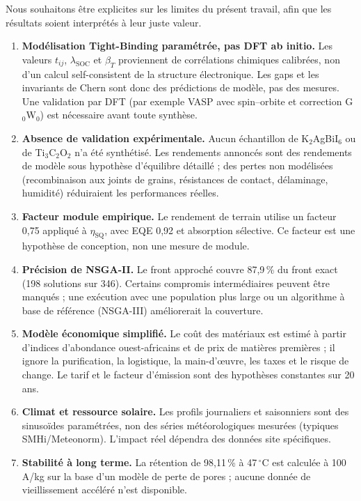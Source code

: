 \documentclass[11pt,a4paper,french]{article}
\begin{document}
Nous souhaitons être explicites sur les limites du présent travail, afin que les résultats soient interprétés à leur juste valeur.

\begin{enumerate}
  \item \textbf{Modélisation Tight-Binding paramétrée, pas DFT ab initio.} Les valeurs $t_{ij}$, $\lambda_{\mathrm{SOC}}$ et $\beta_T$ proviennent de corrélations chimiques calibrées, non d'un calcul self-consistent de la structure électronique. Les gaps et les invariants de Chern sont donc des prédictions de modèle, pas des mesures. Une validation par DFT (par exemple VASP \cite{kresse1996} avec spin--orbite et correction G$_0$W$_0$) est nécessaire avant toute synthèse.
  \item \textbf{Absence de validation expérimentale.} Aucun échantillon de K$_2$AgBiI$_6$ ou de Ti$_3$C$_2$O$_2$ n'a été synthétisé. Les rendements annoncés sont des rendements de modèle sous hypothèse d'équilibre détaillé ; des pertes non modélisées (recombinaison aux joints de grains, résistances de contact, délaminage, humidité) réduiraient les performances réelles.
  \item \textbf{Facteur module empirique.} Le rendement de terrain utilise un facteur 0,75 appliqué à $\eta_{\mathrm{SQ}}$, avec EQE 0,92 et absorption sélective. Ce facteur est une hypothèse de conception, non une mesure de module.
  \item \textbf{Précision de NSGA-II.} Le front approché couvre 87,9\,\% du front exact (198 solutions sur 346). Certains compromis intermédiaires peuvent être manqués ; une exécution avec une population plus large ou un algorithme à base de référence (NSGA-III) améliorerait la couverture.
  \item \textbf{Modèle économique simplifié.} Le coût des matériaux est estimé à partir d'indices d'abondance ouest-africains et de prix de matières premières ; il ignore la purification, la logistique, la main-d'œuvre, les taxes et le risque de change. Le tarif et le facteur d'émission sont des hypothèses constantes sur 20 ans.
  \item \textbf{Climat et ressource solaire.} Les profils journaliers et saisonniers sont des sinusoïdes paramétrées, non des séries météorologiques mesurées (typiques SMHi/Meteonorm). L'impact réel dépendra des données site spécifiques.
  \item \textbf{Stabilité à long terme.} La rétention de 98,11\,\% à 47\,$^\circ$C est calculée à 100\,A/kg sur la base d'un modèle de perte de pores ; aucune donnée de vieillissement accéléré n'est disponible.
\end{enumerate}
\end{document}
